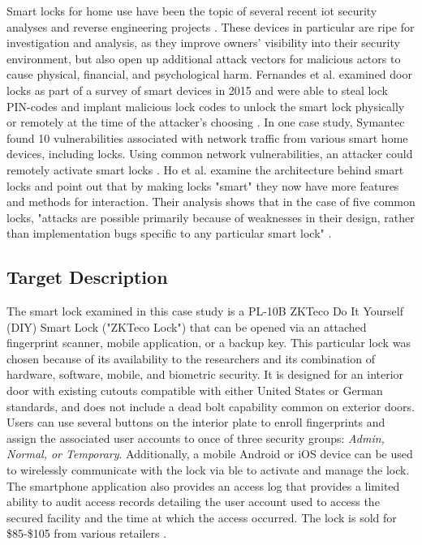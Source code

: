 \documentclass[conference]{IEEEtran}
\begin{document}
Smart locks for home use have been the topic of several recent \gls{iot} security analyses and reverse engineering projects \cite{Ho2016}\cite{Fuller2017}\cite{Ye2017}\cite{Jeong2016}. These devices in particular are ripe for investigation and analysis, as they improve owners' visibility into their security environment, but also open up additional attack vectors for malicious actors to cause physical, financial, and psychological harm. Fernandes et al. examined door locks as part of a survey of smart devices in 2015 and were able to steal lock PIN-codes and implant malicious lock codes to unlock the smart lock physically or remotely at the time of the attacker's choosing \cite{Fernandes2016}. In one case study, Symantec found 10 vulnerabilities associated with network traffic from various smart home devices, including locks. Using common network vulnerabilities, an attacker could remotely activate smart locks \cite{Barcena2015}. Ho et al. examine the architecture behind smart locks and point out that by making locks "smart" they now have more features and methods for interaction. Their analysis shows that in the case of five common locks, "attacks are possible primarily because of weaknesses in their design, rather than implementation bugs specific to any particular smart lock" \cite{Ho2016}.

\subsection{Target Description}

The smart lock examined in this case study is a PL-10B ZKTeco Do It Yourself (DIY) Smart Lock ("ZKTeco Lock") that can be opened via an attached fingerprint scanner, mobile application, or a backup key. This particular lock was chosen because of its availability to the researchers and its combination of hardware, software, mobile, and biometric security. It is designed for an interior door with existing cutouts compatible with either United States or German standards, and does not include a dead bolt capability common on exterior doors. Users can use several buttons on the interior plate to enroll fingerprints and assign the associated user accounts to once of three security groups: \textit{Admin, Normal, or Temporary}.  Additionally, a mobile Android or iOS device can be used to wirelessly communicate with the lock via \gls{ble} to activate and manage the lock. The smartphone application also provides an access log that provides a limited ability to audit access records detailing the user account used to access the secured facility and the time at which the access occurred. The lock is sold for \$85-\$105 from various retailers \cite{ZKTeco}. 
\end{document}
